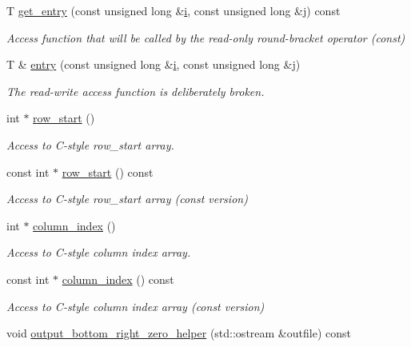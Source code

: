 \begin{DoxyCompactItemize}
T \hyperlink{classoomph_1_1CRMatrix_afc7fe758067c8ab3fe2dba96a4258492}{get\+\_\+entry} (const unsigned long \&\hyperlink{cfortran_8h_adb50e893b86b3e55e751a42eab3cba82}{i}, const unsigned long \&j) const
\begin{DoxyCompactList}\small\item\em Access function that will be called by the read-\/only round-\/bracket operator (const) \end{DoxyCompactList}\item 
T \& \hyperlink{classoomph_1_1CRMatrix_a5ad8bd622cd8929c4fea17cf057f0a73}{entry} (const unsigned long \&\hyperlink{cfortran_8h_adb50e893b86b3e55e751a42eab3cba82}{i}, const unsigned long \&j)
\begin{DoxyCompactList}\small\item\em The read-\/write access function is deliberately broken. \end{DoxyCompactList}\item 
int $\ast$ \hyperlink{classoomph_1_1CRMatrix_a6210ebb3d384de9c3a289f5d841a0d7a}{row\+\_\+start} ()
\begin{DoxyCompactList}\small\item\em Access to C-\/style row\+\_\+start array. \end{DoxyCompactList}\item 
const int $\ast$ \hyperlink{classoomph_1_1CRMatrix_a28d1d96e2259b0a3a8a4f8e4fb312947}{row\+\_\+start} () const
\begin{DoxyCompactList}\small\item\em Access to C-\/style row\+\_\+start array (const version) \end{DoxyCompactList}\item 
int $\ast$ \hyperlink{classoomph_1_1CRMatrix_aa6057d1c2a9a491f643e0633c778f8fb}{column\+\_\+index} ()
\begin{DoxyCompactList}\small\item\em Access to C-\/style column index array. \end{DoxyCompactList}\item 
const int $\ast$ \hyperlink{classoomph_1_1CRMatrix_a278c99924c90c8eaccc7c325685a3dc7}{column\+\_\+index} () const
\begin{DoxyCompactList}\small\item\em Access to C-\/style column index array (const version) \end{DoxyCompactList}\item 
void \hyperlink{classoomph_1_1CRMatrix_abf764862746afbbe2655a41bdf726327}{output\+\_\+bottom\+\_\+right\+\_\+zero\+\_\+helper} (std\+::ostream \&outfile) const

\end{DoxyCompactItemize}
